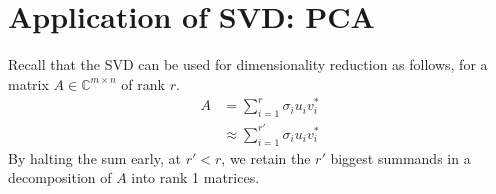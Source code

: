 
%

\section{Application of SVD: PCA}
Recall that the SVD can be used for dimensionality reduction as follows, for a matrix
\(A \in \mathbb{C}^{m\times n}\) of rank \(r\).
\begin{align}
  A &= \sum_{i = 1}^{r} \sigma_i u_i v_i^* \\
  &\approx \sum_{i = 1}^{r'} \sigma_i u_i v_i^*
\end{align}
By halting the sum early, at \(r' < r\), we retain the \(r'\) biggest summands in a decomposition of \(A\) into rank 1 matrices.

